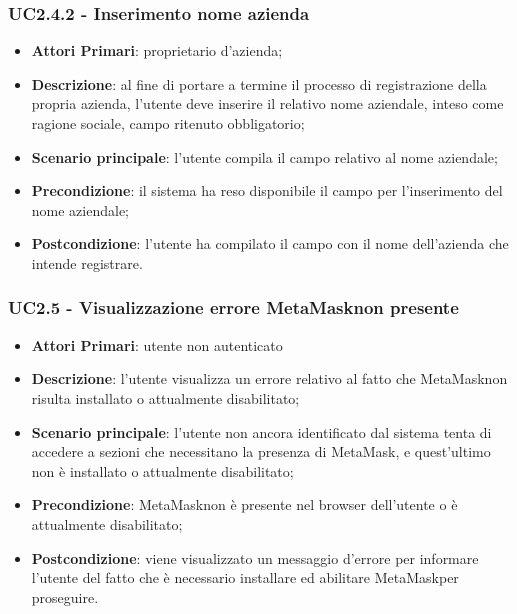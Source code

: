 \subsubsection{UC2.4.2 - Inserimento nome azienda}
\begin{itemize}
	\item \textbf{Attori Primari}: proprietario d'azienda;
	\item \textbf{Descrizione}: al fine di portare a termine il processo di registrazione della propria azienda, l'utente deve inserire il relativo nome aziendale, inteso come ragione sociale, campo ritenuto obbligatorio;
	\item \textbf{Scenario principale}: l'utente compila il campo relativo al nome aziendale;
	\item \textbf{Precondizione}: il sistema ha reso disponibile il campo per l'inserimento del nome aziendale;
	\item \textbf{Postcondizione}: l'utente ha compilato il campo con il nome dell'azienda che intende registrare.
\end{itemize}



\subsubsection{UC2.5 - Visualizzazione errore MetaMask\glosp non presente}
\begin{itemize}
	\item \textbf{Attori Primari}: utente non autenticato
	\item \textbf{Descrizione}: l'utente visualizza un errore relativo al fatto che MetaMask\glosp non risulta installato o attualmente disabilitato;
	\item \textbf{Scenario principale}: l'utente non ancora identificato dal sistema tenta di accedere a sezioni che necessitano la presenza di MetaMask\glosp, e quest'ultimo non è installato o attualmente disabilitato;
	\item \textbf{Precondizione}: MetaMask\glosp non è presente nel browser dell'utente o è attualmente disabilitato;
	\item \textbf{Postcondizione}: viene visualizzato un messaggio d'errore per informare l'utente del fatto che è necessario installare ed abilitare MetaMask\glosp per proseguire.
	
\end{itemize}

